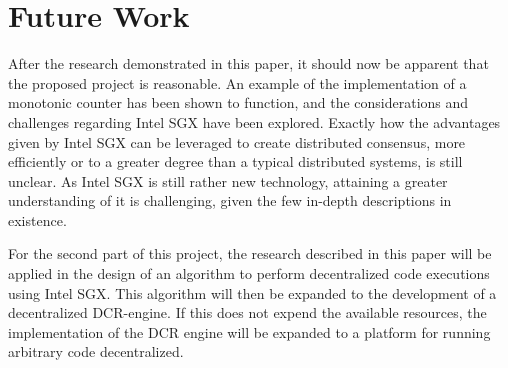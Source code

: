 \documentclass[12pt]{article}
\begin{document}
	\section{Future Work}
	After the research demonstrated in this paper, it should now be apparent that the proposed project is reasonable.
	An example of the implementation of a monotonic counter has been shown to function, and the considerations and challenges regarding Intel SGX have been explored.
	Exactly how the advantages given by Intel SGX can be leveraged to create distributed consensus, more efficiently or to a greater degree than a typical distributed systems, is still unclear.
	As Intel SGX is still rather new technology, attaining a greater understanding of it is challenging, given the few in-depth descriptions in existence.

	For the second part of this project, the research described in this paper will be applied in the design of an algorithm to perform decentralized code executions using Intel SGX.
	This algorithm will then be expanded to the development of a decentralized DCR-engine.
	If this does not expend the available resources, the implementation of the DCR engine will be expanded to a platform for running arbitrary code decentralized.
\end{document}
